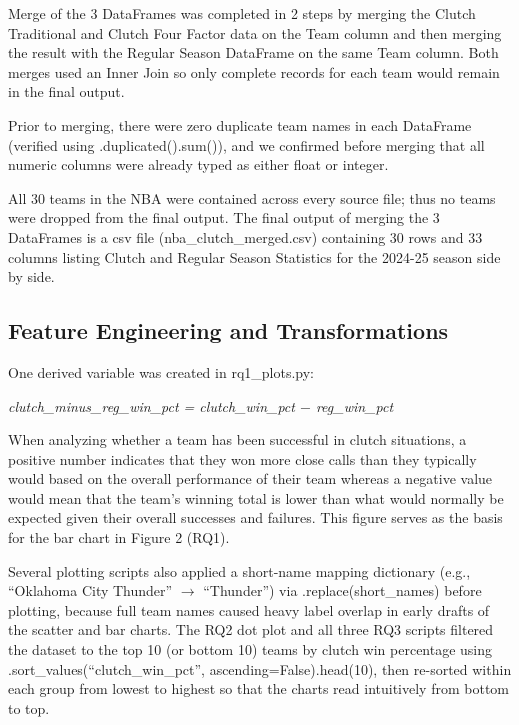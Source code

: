 \begin{sloppypar}
Merge of the 3 DataFrames was completed in 2 steps by merging the Clutch Traditional and Clutch Four Factor data on the Team column and then merging the result with the Regular Season DataFrame on the same Team column. Both merges used an Inner Join so only complete records for each team would remain in the final output.

Prior to merging, there were zero duplicate team names in each DataFrame (verified using .duplicated().sum()), and we confirmed before merging that all numeric columns were already typed as either float or integer.

All 30 teams in the NBA were contained across every source file; thus no teams were dropped from the final output. The final output of merging the 3 DataFrames is a csv file (nba\_clutch\_merged.csv) containing 30 rows and 33 columns listing Clutch and Regular Season Statistics for the 2024-25 season side by side.
\end{sloppypar}

\subsection{Feature Engineering and Transformations}

\begin{sloppypar}
One derived variable was created in rq1\_plots.py:

\emph{clutch\_minus\_reg\_win\_pct = clutch\_win\_pct $-$ reg\_win\_pct}

When analyzing whether a team has been successful in clutch situations, a positive number indicates that they won more close calls than they typically would based on the overall performance of their team whereas a negative value would mean that the team's winning total is lower than what would normally be expected given their overall successes and failures. This figure serves as the basis for the bar chart in Figure 2 (RQ1).

Several plotting scripts also applied a short-name mapping dictionary (e.g., ``Oklahoma City Thunder'' $\to$ ``Thunder'') via .replace(short\_names) before plotting, because full team names caused heavy label overlap in early drafts of the scatter and bar charts. The RQ2 dot plot and all three RQ3 scripts filtered the dataset to the top 10 (or bottom 10) teams by clutch win percentage using .sort\_values(``clutch\_win\_pct'', ascending=False).head(10), then re-sorted within each group from lowest to highest so that the charts read intuitively from bottom to top.
\end{sloppypar}

